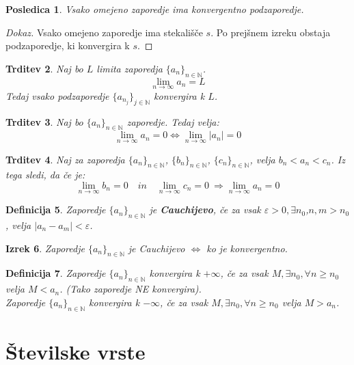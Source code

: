 \documentclass[11pt]{article}
\newtheorem{Izrek}{{\sc Izrek}}[section]
\newtheorem{Trditev}[Izrek]{{\sc Trditev}}
\newtheorem{Posledica}[Izrek]{{\sc Posledica}}
\newtheorem{Definicija}[Izrek]{{\sc Definicija}}
\newenvironment{dokaz}[1][{\sc Dokaz}]{\begin{proof}[#1]\renewcommand*{\qedsymbol}{\(\blacksquare\)}}{\end{proof}}
\begin{document}
\begin{Posledica}
	Vsako omejeno zaporedje ima konvergentno podzaporedje.
\end{Posledica}
\begin{dokaz}
	Vsako omejeno zaporedje ima stekališče $s$. Po prejšnem izreku obstaja podzaporedje, ki konvergira k $s$.
\end{dokaz}
\begin{Trditev}
	Naj bo $L$ limita zaporedja  $\{a_n\}_{n\in \mathbb{N}}$.
	$$\lim\limits_{n \to \infty}{a_n} = L$$
	Tedaj vsako podzaporedje  $\{a_{n_j}\}_{j\in \mathbb{N}}$ konvergira k $L$.
\end{Trditev}
\begin{Trditev}
	Naj bo  $\{a_n\}_{n\in \mathbb{N}}$ zaporedje. Tedaj velja:
	$$\lim\limits_{n \to \infty}{a_n} = 0 \iff \lim\limits_{n \to \infty}{|a_n|} = 0$$
\end{Trditev}
\begin{Trditev}
	Naj za zaporedja  $\{a_n\}_{n\in \mathbb{N}}$,  $\{b_n\}_{n\in \mathbb{N}}$,  $\{c_n\}_{n\in \mathbb{N}}$, velja $ b_n <a_n < c_n$.
	Iz tega sledi, da če je:
	$$ \lim\limits_{n \to \infty}{b_n} = 0 \quad   in  \quad \lim\limits_{n \to \infty}{c_n} = 0 \ \Rightarrow \lim\limits_{n \to \infty}{a_n} = 0$$
\end{Trditev}

\begin{Definicija}
	Zaporedje  $\{a_n\}_{n\in \mathbb{N}}$ je \textbf{Cauchijevo}, če za vsak $\varepsilon > 0, \exists n_0$,\newline$ n,m >n_0$, velja $|a_n - a_m| < \varepsilon$.
\end{Definicija}
\begin{Izrek}
	Zaporedje $\{a_n\}_{n\in \mathbb{N}}$ je Cauchijevo $\iff$ ko je konvergentno.
\end{Izrek}

\begin{Definicija}
	Zaporedje $\{a_n\}_{n\in \mathbb{N}}$ konvergira k  $ + \infty$, če za vsak $M, \exists n_0, \forall n \ge n_0$ velja $M < a_n$. (Tako zaporedje NE konvergira).
	\\
	\indent Zaporedje $\{a_n\}_{n\in \mathbb{N}}$ konvergira k  $ - \infty$, če za vsak $M, \exists n_0, \forall n \ge n_0$ velja $M > a_n$.
\end{Definicija}

\pagebreak
\section{Številske vrste}
\end{document}
